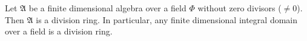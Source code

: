 Let $\mathfrak{A}$ be a finite dimensional algebra over a field $\Phi$ without zero divisors ($\neq 0$). Then $\mathfrak{A}$ is a division ring. In particular, any finite dimensional integral domain over a field is a division ring.

